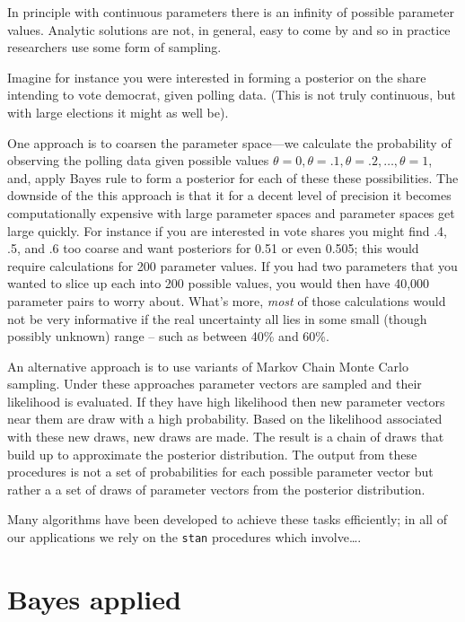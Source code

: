 \documentclass[12pt,]{book}
\begin{document}
In principle with continuous parameters there is an infinity of possible parameter values. Analytic solutions are not, in general, easy to come by and so in practice researchers use some form of sampling.

Imagine for instance you were interested in forming a posterior on the share intending to vote democrat, given polling data. (This is not truly continuous, but with large elections it might as well be).

One approach is to coarsen the parameter space---we calculate the probability of observing the polling data given possible values \(\theta = 0, \theta = .1, \theta = .2, \dots, \theta = 1\), and, apply Bayes rule to form a posterior for each of these these possibilities. The downside of the this approach is that it for a decent level of precision it becomes computationally expensive with large parameter spaces and parameter spaces get large quickly. For instance if you are interested in vote shares you might find .4, .5, and .6 too coarse and want posteriors for 0.51 or even 0.505; this would require calculations for 200 parameter values. If you had two parameters that you wanted to slice up each into 200 possible values, you would then have 40,000 parameter pairs to worry about. What's more, \emph{most} of those calculations would not be very informative if the real uncertainty all lies in some small (though possibly unknown) range -- such as between 40\% and 60\%.

An alternative approach is to use variants of Markov Chain Monte Carlo sampling. Under these approaches parameter vectors are sampled and their likelihood is evaluated. If they have high likelihood then new parameter vectors near them are draw with a high probability. Based on the likelihood associated with these new draws, new draws are made. The result is a chain of draws that build up to approximate the posterior distribution. The output from these procedures is not a set of probabilities for each possible parameter vector but rather a a set of draws of parameter vectors from the posterior distribution.

Many algorithms have been developed to achieve these tasks efficiently; in all of our applications we rely on the \texttt{stan} procedures which involve\ldots{}.

\hypertarget{bayes-applied}{%
\section{Bayes applied}\label{bayes-applied}}
\end{document}
